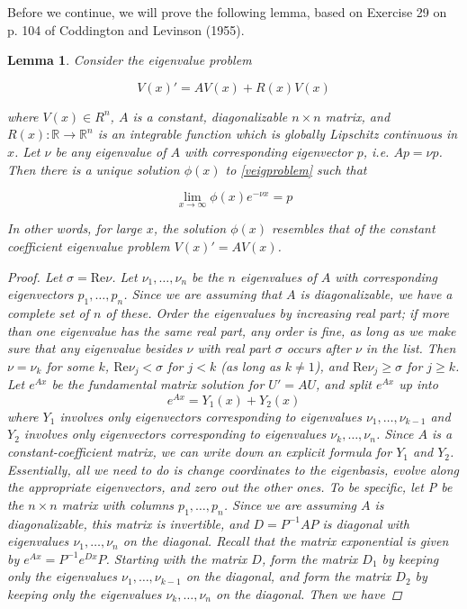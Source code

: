 \documentclass[12pt]{article}
\def\R{{\mathbb R}}
\newtheorem{lemma}{Lemma}
\begin{document}
Before we continue, we will prove the following lemma, based on Exercise 29 on p. 104 of Coddington and Levinson (1955).

\begin{lemma}Consider the eigenvalue problem

\begin{equation}\label{veigproblem}
V(x)' = AV(x) + R(x)V(x)
\end{equation}

where $V(x) \in R^n$, $A$ is a constant, diagonalizable $n \times n$ matrix, and $R(x): \R \rightarrow \R^n$ is an integrable function which is globally Lipschitz continuous in $x$. Let $\nu$ be any eigenvalue of $A$ with corresponding eigenvector $p$, i.e. $A p = \nu p$. Then there is a unique solution $\phi(x)$ to \eqref{veigproblem} such that 

\[
\lim_{x\rightarrow\infty} \phi(x) e^{-\nu x} = p
\]

In other words, for large $x$, the solution $\phi(x)$ resembles that of the constant coefficient eigenvalue problem $V(x)' = AV(x)$.

\begin{proof}
Let $\sigma = \text{Re} \nu$. Let $\nu_1, \dots, \nu_n$ be the $n$ eigenvalues of $A$ with corresponding eigenvectors $p_1, \dots, p_n$. Since we are assuming that $A$ is diagonalizable, we have a complete set of $n$ of these. Order the eigenvalues by increasing real part; if more than one eigenvalue has the same real part, any order is fine, as long as we make sure that any eigenvalue besides $\nu$ with real part $\sigma$ occurs after $\nu$ in the list. Then $\nu = \nu_k$ for some $k$, $\text{Re} \nu_j < \sigma$ for $j < k$ (as long as $k \neq 1$), and $\text{Re} \nu_j \geq \sigma$ for $j \geq k$. \\

Let $e^{Ax}$ be the fundamental matrix solution for $U' = A U$, and split $e^{Ax}$ up into
\[
e^{Ax} = Y_1(x) + Y_2(x)
\]
where $Y_1$ involves only eigenvectors corresponding to eigenvalues $\nu_1, \dots, \nu_{k-1}$ and $Y_2$ involves only eigenvectors corresponding to eigenvalues $\nu_{k}, \dots, \nu_n$. Since $A$ is a constant-coefficient matrix, we can write down an explicit formula for $Y_1$ and $Y_2$. Essentially, all we need to do is change coordinates to the eigenbasis, evolve along the appropriate eigenvectors, and zero out the other ones. To be specific, let P be the $n \times n$ matrix with columns $p_1, \dots, p_n$. Since we are assuming $A$ is diagonalizable, this matrix is invertible, and $D = P^{-1}AP$ is diagonal with eigenvalues $\nu_1, \dots, \nu_n$ on the diagonal. Recall that the matrix exponential is given by $e^{Ax} = P^{-1}e^{Dx}P$. Starting with the matrix $D$, form the matrix $D_1$ by keeping only the eigenvalues $\nu_1, \dots, \nu_{k-1}$ on the diagonal, and form the matrix $D_2$ by keeping only the eigenvalues $\nu_{k}, \dots, \nu_n$ on the diagonal. Then we have


\end{proof}
\end{lemma}
\end{document}
